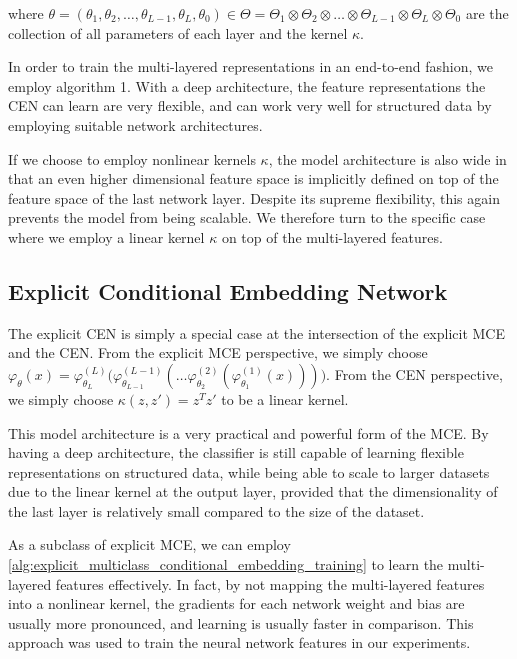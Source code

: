\documentclass{llncs}
\numberwithin{equation}{section}
\numberwithin{table}{section}
\numberwithin{algorithm}{section}
\begin{document}
	where $\theta = (\theta_{1}, \theta_{2}, \dots, \theta_{L -1}, \theta_{L}, \theta_{0}) \in \Theta = \Theta_{1} \otimes \Theta_{2} \otimes \dots \otimes \Theta_{L - 1} \otimes \Theta_{L} \otimes \Theta_{0}$ are the collection of all parameters of each layer and the kernel $\kappa$.
	
	In order to train the multi-layered representations in an end-to-end fashion, we employ algorithm 1. With a deep architecture, the feature representations the \gls{CEN} can learn are very flexible, and can work very well for structured data by employing suitable network architectures.
	
	If we choose to employ nonlinear kernels $\kappa$, the model architecture is also wide in that an even higher dimensional feature space is implicitly defined on top of the feature space of the last network layer. Despite its supreme flexibility, this again prevents the model from being scalable. We therefore turn to the specific case where we employ a linear kernel $\kappa$ on top of the multi-layered features.
	
	\subsection{Explicit Conditional Embedding Network}
	\label{app:explicit_conditional_embedding_network}
	
	The explicit \gls{CEN} is simply a special case at the intersection of the explicit \gls{MCE} and the \gls{CEN}. From the explicit \gls{MCE} perspective, we simply choose $\varphi_{\theta}(x) = \varphi^{(L)}_{\theta_{L}}\big(\varphi^{(L - 1)}_{\theta_{L - 1}}(\dots\varphi^{(2)}_{\theta_{2}}(\varphi^{(1)}_{\theta_{1}}(x)))\big)$. From the \gls{CEN} perspective, we simply choose $\kappa(z, z') = z^{T} z'$ to be a linear kernel.
	
	This model architecture is a very practical and powerful form of the \gls{MCE}. By having a deep architecture, the classifier is still capable of learning flexible representations on structured data, while being able to scale to larger datasets due to the linear kernel at the output layer, provided that the dimensionality of the last layer is relatively small compared to the size of the dataset.
	
	As a subclass of explicit \gls{MCE}, we can employ \cref{alg:explicit_multiclass_conditional_embedding_training} to learn the multi-layered features effectively. In fact, by not mapping the multi-layered features into a nonlinear kernel, the gradients for each network weight and bias are usually more pronounced, and learning is usually faster in comparison. This approach was used to train the neural network features in our experiments.
	
	\newpage
	
	
	
\end{document}
